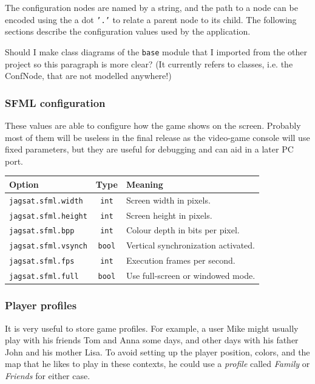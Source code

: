 \documentclass[12pt,a4paper]{article}
\begin{document}
The configuration nodes are named by a string, and the path to a node
can be encoded using the a dot \texttt{'.'} to relate a parent node to
its child. The following sections describe the configuration values
used by the application.

\begin{todo}
  Should I make class diagrams of the \texttt{base} module that I
  imported from the other project so this paragraph is more clear? (It
  currently refers to classes, i.e. the ConfNode, that are not
  modelled anywhere!)
\end{todo}

\subsubsection{SFML configuration}

These values are able to configure how the game shows on the
screen. Probably most of them will be useless in the final release as
the video-game console will use fixed parameters, but they are useful
for debugging and can aid in a later PC port.

\begin{table}[h]
  \centering
  \begin{tabular}[h]{l|c|p{7cm}}
    Option & Type & Meaning \\ \hline\hline
    
    \texttt{jagsat.sfml.width} & \texttt{int} & Screen width in
    pixels.\\
    \texttt{jagsat.sfml.height} & \texttt{int} & Screen height in
    pixels.\\
    \texttt{jagsat.sfml.bpp} & \texttt{int} & Colour depth in bits per pixel.\\
    \texttt{jagsat.sfml.vsynch} & \texttt{bool} & Vertical
    synchronization activated. \\
    \texttt{jagsat.sfml.fps} & \texttt{int} & Execution frames per
    second. \\
    \texttt{jagsat.sfml.full} & \texttt{bool} & Use full-screen
    or windowed mode.    
  \end{tabular}
\end{table}


\subsubsection{Player profiles}

It is very useful to store game profiles. For example, a user Mike might
usually play with his friends Tom and Anna some days, and other days
with his father John and his mother Lisa. To avoid setting up the
player position, colors, and the map that he likes to play in these
contexts, he could use a \emph{profile} called \emph{Family} or
\emph{Friends} for either case.
\end{document}
